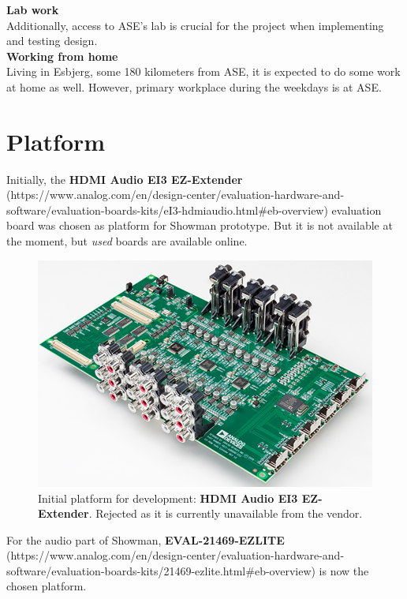 \textbf{Lab work} \\
Additionally, access to ASE's lab is crucial for the project when implementing and testing design. \\

\textbf{Working from home} \\
Living in Esbjerg, some 180 kilometers from ASE, it is expected to do some work at home as well. However, primary workplace during the weekdays is at ASE. \\

\section{Platform}
Initially, the \textbf{HDMI Audio EI3 EZ-Extender} (https://www.analog.com/en/design-center/evaluation-hardware-and-software/evaluation-boards-kits/eI3-hdmiaudio.html\#eb-overview) evaluation board was chosen as platform for Showman prototype. But it is not available at the moment, but \textit{used} boards are available online. \\

\begin{figure}[H]
\centering
\includegraphics[scale=1]{./pictures/ei3.png}
\caption{Initial platform for development: \textbf{HDMI Audio EI3 EZ-Extender}. Rejected as it is currently unavailable from the vendor.}
\label{fig:ei3.png}
\end{figure}

For the audio part of Showman, \textbf{EVAL-21469-EZLITE} (https://www.analog.com/en/design-center/evaluation-hardware-and-software/evaluation-boards-kits/21469-ezlite.html\#eb-overview) is now the chosen platform. \\

